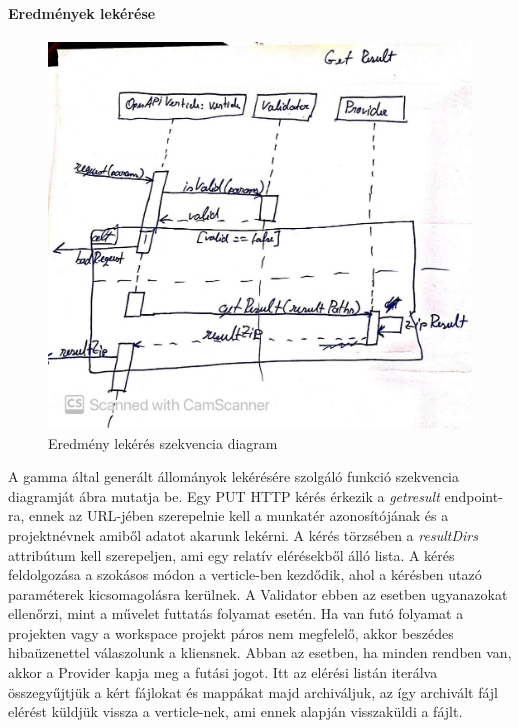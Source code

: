 \paragraph{Eredmények lekérése}
\begin{figure}[!ht]
	\includegraphics[width=150mm, keepaspectratio]{figures/get_result_seq.jpg}
	\caption{Eredmény lekérés szekvencia diagram}
	\label{fig:getresult}
\end{figure}
A gamma által generált állományok lekérésére szolgáló funkció szekvencia diagramját  ábra mutatja be. Egy PUT HTTP kérés érkezik a \textit{getresult} endpoint-ra, ennek az URL-jében szerepelnie kell a munkatér azonosítójának és a projektnévnek amiből adatot akarunk lekérni. A kérés törzsében a \textit{resultDirs} attribútum kell szerepeljen, ami egy relatív elérésekből álló lista. A kérés feldolgozása a szokásos módon a verticle-ben kezdődik, ahol a kérésben utazó paraméterek kicsomagolásra kerülnek. A Validator ebben az esetben ugyanazokat ellenőrzi, mint a művelet futtatás folyamat esetén. Ha van futó folyamat a projekten vagy a workspace projekt páros nem megfelelő, akkor beszédes hibaüzenettel válaszolunk a kliensnek. Abban az esetben, ha minden rendben van, akkor a Provider kapja meg  a futási jogot. Itt az elérési listán iterálva összegyűjtjük a kért fájlokat és mappákat majd archiváljuk, az így archivált fájl elérést küldjük vissza a verticle-nek, ami ennek alapján visszaküldi a fájlt.

